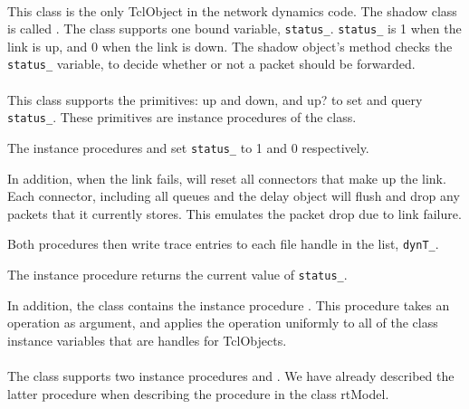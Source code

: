 \paragraph{\protect{}}
This class is the only TclObject in the network dynamics code.
The shadow class is called .
The class supports one bound variable, {\tt status\_}.
{\tt status\_} is 1 when the link is up, and 0 when the link is down.
The shadow object's 
method checks the {\tt status\_} variable, to decide whether or not
a packet should be forwarded.

\paragraph{\protect{}}
This class supports the primitives:
up and down, and up? to set and query {\tt status\_}.
These primitives are instance procedures of the class.
\begin{list}{}{}
\item  The instance procedures
   and
  set {\tt status\_} to 1 and 0 respectively.

  In addition, when the link fails, 
  will reset all connectors that make up the link.
  Each connector, including all queues and the delay object
  will flush and drop any packets that it currently stores.
  This emulates the packet drop due to link failure.

  Both procedures then write trace entries to each file handle
  in the list, {\tt dynT\_}.

\item The instance procedure
  returns the current value of {\tt status\_}.
\end{list}
In addition, the class contains the instance procedure
.
This procedure takes an operation as argument, and applies
the operation uniformly to all of the class instance variables
that are handles for TclObjects.

\paragraph{\protect{}}
The class supports two instance procedures
 and
.
We have already described the latter procedure when describing the
 procedure in the class rtModel.

